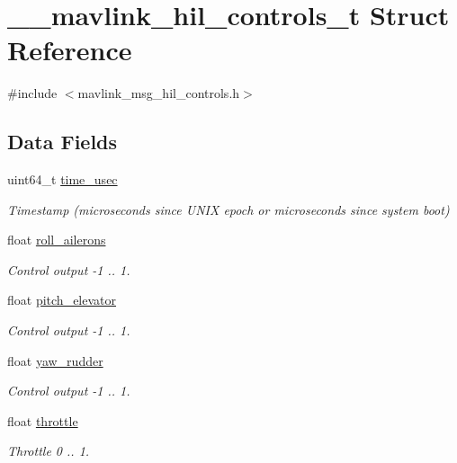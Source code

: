 \hypertarget{struct____mavlink__hil__controls__t}{\section{\-\_\-\-\_\-mavlink\-\_\-hil\-\_\-controls\-\_\-t Struct Reference}
\label{struct____mavlink__hil__controls__t}
}


{\ttfamily \#include $<$mavlink\-\_\-msg\-\_\-hil\-\_\-controls.\-h$>$}

\subsection*{Data Fields}
\begin{DoxyCompactItemize}
\item 
uint64\-\_\-t \hyperlink{struct____mavlink__hil__controls__t_a209e91b6d93c47abba3dc4ed3c6625f2}{time\-\_\-usec}
\begin{DoxyCompactList}\small\item\em Timestamp (microseconds since U\-N\-I\-X epoch or microseconds since system boot) \end{DoxyCompactList}\item 
float \hyperlink{struct____mavlink__hil__controls__t_a65303ffed89e791c1551bf41d3d764dc}{roll\-\_\-ailerons}
\begin{DoxyCompactList}\small\item\em Control output -\/1 .. 1. \end{DoxyCompactList}\item 
float \hyperlink{struct____mavlink__hil__controls__t_ae1da8c6e2be5e9927f9748671d901764}{pitch\-\_\-elevator}
\begin{DoxyCompactList}\small\item\em Control output -\/1 .. 1. \end{DoxyCompactList}\item 
float \hyperlink{struct____mavlink__hil__controls__t_addcaf6167ddb280643e69558a0532dd8}{yaw\-\_\-rudder}
\begin{DoxyCompactList}\small\item\em Control output -\/1 .. 1. \end{DoxyCompactList}\item 
float \hyperlink{struct____mavlink__hil__controls__t_a9249963d6b4959b9cbc952ad86e2a2f1}{throttle}
\begin{DoxyCompactList}\small\item\em Throttle 0 .. 1. \end{DoxyCompactList}\item 

\end{DoxyCompactItemize}
